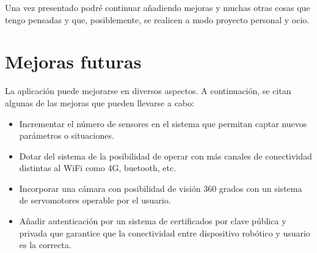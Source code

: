 Una vez presentado podré continuar añadiendo mejoras y muchas otras cosas que tengo pensadas y que, posiblemente, se realicen a modo proyecto personal y ocio.\\

\section{Mejoras futuras}
\label{sec:mejoras_futuras}

La aplicación puede mejorarse en diversos aspectos. A continuación, se citan algunas de las mejoras que pueden llevarse a cabo:

\begin{itemize}
  \item Incrementar el número de sensores en el sistema que permitan captar nuevos parámetros o situaciones.
  \item Dotar del sistema de la posibilidad de operar con más canales de conectividad distintas al WiFi como 4G, buetooth, etc.
  \item Incorporar una cámara con posibilidad de visión 360 grados con un sistema de servomotores operable por el usuario.
  \item Añadir autenticación por un sistema de certificados por clave pública y privada que garantice que la conectividad entre dispositivo robótico y usuario es la correcta.
\end{itemize}

